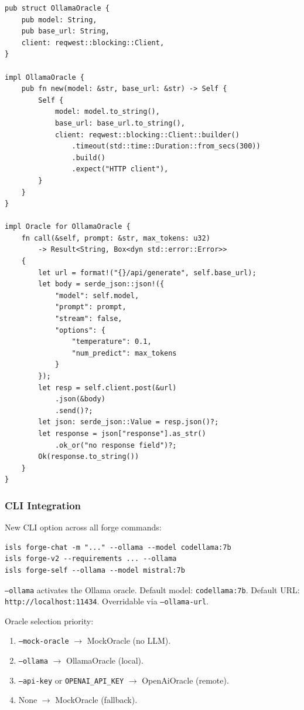 \documentclass[11pt,a4paper]{article}
\begin{document}
\begin{lstlisting}[style=rust]
pub struct OllamaOracle {
    pub model: String,
    pub base_url: String,
    client: reqwest::blocking::Client,
}

impl OllamaOracle {
    pub fn new(model: &str, base_url: &str) -> Self {
        Self {
            model: model.to_string(),
            base_url: base_url.to_string(),
            client: reqwest::blocking::Client::builder()
                .timeout(std::time::Duration::from_secs(300))
                .build()
                .expect("HTTP client"),
        }
    }
}

impl Oracle for OllamaOracle {
    fn call(&self, prompt: &str, max_tokens: u32) 
        -> Result<String, Box<dyn std::error::Error>> 
    {
        let url = format!("{}/api/generate", self.base_url);
        let body = serde_json::json!({
            "model": self.model,
            "prompt": prompt,
            "stream": false,
            "options": {
                "temperature": 0.1,
                "num_predict": max_tokens
            }
        });
        let resp = self.client.post(&url)
            .json(&body)
            .send()?;
        let json: serde_json::Value = resp.json()?;
        let response = json["response"].as_str()
            .ok_or("no response field")?;
        Ok(response.to_string())
    }
}
\end{lstlisting}

\subsubsection{CLI Integration}

New CLI option across all forge commands:

\begin{lstlisting}[style=bash]
isls forge-chat -m "..." --ollama --model codellama:7b
isls forge-v2 --requirements ... --ollama
isls forge-self --ollama --model mistral:7b
\end{lstlisting}

\texttt{--ollama} activates the Ollama oracle. Default model: 
\texttt{codellama:7b}. Default URL: \texttt{http://localhost:11434}.
Overridable via \texttt{--ollama-url}.

Oracle selection priority:
\begin{enumerate}[nosep]
\item \texttt{--mock-oracle} $\to$ MockOracle (no LLM).
\item \texttt{--ollama} $\to$ OllamaOracle (local).
\item \texttt{--api-key} or \texttt{OPENAI\_API\_KEY} $\to$ 
      OpenAiOracle (remote).
\item None $\to$ MockOracle (fallback).
\end{enumerate}
\end{document}
